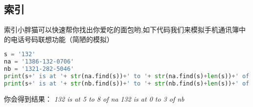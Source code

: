 \subsection{索引}
索引小胖猫可以快速帮你找出你爱吃的面包哟,如下代码我们来模拟手机通讯簿中的电话号码联想功能（简陋的模拟）

\begin{lstlisting}[language=python]
s = '132'
na = '1386-132-0706'
nb = '1321-282-5046'
print(s+' is at '+ str(na.find(s))+' to '+ str(na.find(s)+len(s))+' of na')
print(s+' is at '+ str(nb.find(s))+' to '+ str(nb.find(s)+len(s))+' of nb')
\end{lstlisting}
你会得到结果：
\textsl{132 is at 5 to 8 of na}
 \textsl{ }
\textsl{132 is at 0 to 3 of nb}
